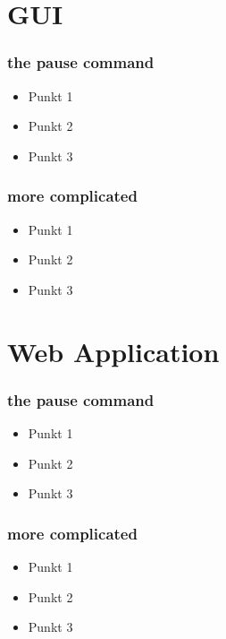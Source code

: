 \documentclass{beamer}
\begin{document}
\section{GUI}

\begin{frame}
\frametitle{the pause command}
\begin{itemize}
	\item Punkt 1\pause
	\item Punkt 2\pause
	\item Punkt 3
\end{itemize}
\end{frame}

\begin{frame}
\frametitle{more complicated}
\begin{itemize}
	\item<-2,4> Punkt 1
	\item<2 ,4> Punkt 2
	\item<3-> Punkt 3
\end{itemize}
\end{frame}

\section{Web Application}

\begin{frame}
\frametitle{the pause command}
\begin{itemize}
	\item Punkt 1\pause
	\item Punkt 2\pause
	\item Punkt 3
\end{itemize}
\end{frame}

\begin{frame}
\frametitle{more complicated}
\begin{itemize}
	\item<-2,4> Punkt 1
	\item<2 ,4> Punkt 2
	\item<3-> Punkt 3
\end{itemize}
\end{frame}
\end{document}
